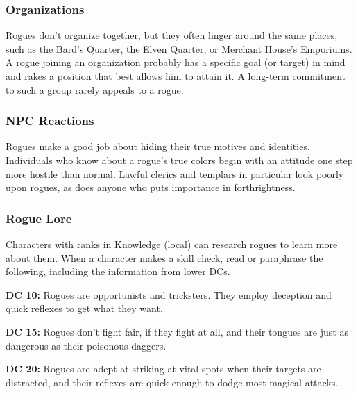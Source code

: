 \subsubsection{Organizations}
Rogues don’t organize together, but they often linger around the same places, such as the Bard’s Quarter, the Elven Quarter, or Merchant House’s Emporiums. A rogue joining an organization probably has a specific goal (or target) in mind and rakes a position that best allows him to attain it. A long‐term commitment to such a group rarely appeals to a rogue.

\subsubsection{NPC Reactions}
Rogues make a good job about hiding their true motives and identities. Individuals who know about a rogue’s true colors begin with an attitude one step more hostile than normal. Lawful clerics and templars in particular look poorly upon rogues, as does anyone who puts importance in forthrightness.

\subsubsection{Rogue Lore}
Characters with ranks in Knowledge (local) can research rogues to learn more about them. When a character makes a skill check, read or paraphrase the following, including the information from lower DCs.

\textbf{DC 10:} Rogues are opportunists and tricksters. They employ deception and quick reflexes to get what they want.

\textbf{DC 15:} Rogues don’t fight fair, if they fight at all, and their tongues are just as dangerous as their poisonous daggers.

\textbf{DC 20:} Rogues are adept at striking at vital spots when their targets are distracted, and their reflexes are quick enough to dodge most magical attacks.